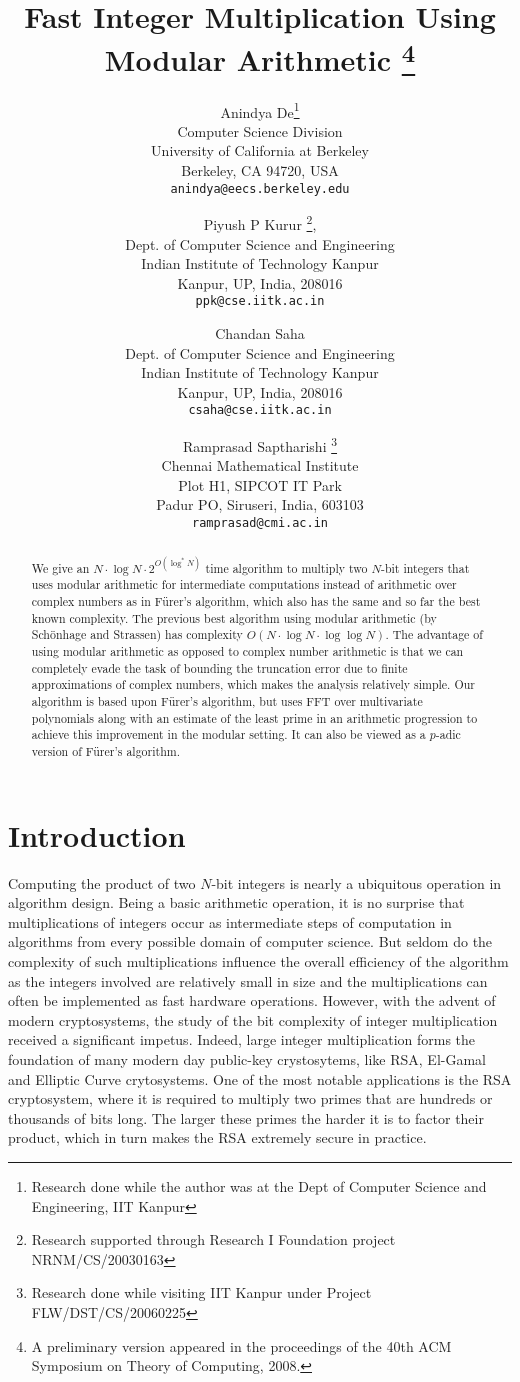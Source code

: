 \documentclass[11pt]{article}
\title{Fast Integer Multiplication Using Modular Arithmetic \footnote{A preliminary version appeared in the proceedings of the 40th ACM Symposium on Theory of Computing, 2008.}}
\author{Anindya De\thanks{Research done while the author was at the Dept
    of Computer Science and Engineering, IIT Kanpur}\\
  Computer Science Division\\
  University of California at Berkeley\\
  Berkeley, CA 94720, USA\\
  {\tt anindya@eecs.berkeley.edu}\\
  \and
  Piyush P Kurur%
  \thanks{Research supported through Research I Foundation project
    NRNM/CS/20030163},\\ %
  Dept. of Computer Science and Engineering\\%
  Indian Institute of Technology Kanpur\\%
  Kanpur, UP, India, 208016\\
  {\tt ppk@cse.iitk.ac.in}\\%
  \and%
  Chandan Saha\\%
  Dept. of Computer Science and Engineering\\%
  Indian Institute of Technology Kanpur\\%
  Kanpur, UP, India, 208016\\%
  {\tt csaha@cse.iitk.ac.in}%
  \and  Ramprasad Saptharishi%
  \thanks{Research done while visiting IIT Kanpur %
    under Project FLW/DST/CS/20060225}\\%
  Chennai Mathematical Institute\\%
  Plot H1, SIPCOT IT Park\\%
  Padur PO, Siruseri, India, 603103\\%
  {\tt ramprasad@cmi.ac.in}
}
\date{}
\begin{document}
\maketitle
\begin{abstract}
We give an $N\cdot \log N\cdot 2^{O(\log^*N)}$ time algorithm to
multiply two $N$-bit integers that uses modular arithmetic for
intermediate computations instead of arithmetic over complex numbers
as in F\"{u}rer's algorithm, which also has the same and so far the
best known complexity. The previous best algorithm using modular
arithmetic (by Sch{\"{o}}nhage and Strassen) has complexity $O(N \cdot
\log N \cdot \log\log N)$. The advantage of using modular arithmetic
as opposed to complex number arithmetic is that we can completely
evade the task of bounding the truncation error due to finite
approximations of complex numbers, which makes the analysis relatively
simple. Our algorithm is based upon F\"{u}rer's algorithm, but uses
FFT over multivariate polynomials along with an estimate of the least
prime in an arithmetic progression to achieve this improvement in the
modular setting. It can also be viewed as a $p$-adic version of
F\"{u}rer's algorithm.
\end{abstract}

\section{Introduction}

Computing the product of two $N$-bit integers is nearly a ubiquitous
operation in algorithm design. Being a basic arithmetic operation, it
is no surprise that multiplications of integers occur as intermediate
steps of computation in algorithms from every possible domain of
computer science. But seldom do the complexity of such multiplications
influence the overall efficiency of the algorithm as the integers
involved are relatively small in size and the multiplications can
often be implemented as fast hardware operations. However, with the
advent of modern cryptosystems, the study of the bit complexity of
integer multiplication received a significant impetus. Indeed, large
integer multiplication forms the foundation of many modern day
public-key crystosytems, like RSA, El-Gamal and Elliptic Curve
crytosystems. One of the most notable applications is the RSA
cryptosystem, where it is required to multiply two primes that are
hundreds or thousands of bits long. The larger these primes the harder
it is to factor their product, which in turn makes the RSA extremely
secure in practice.
\end{document}
